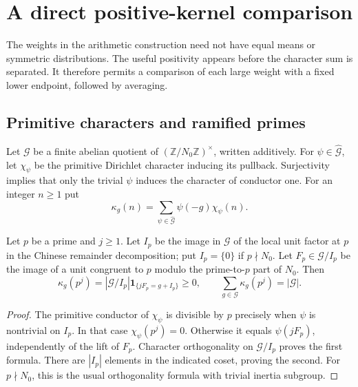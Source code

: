 \section{A direct positive-kernel comparison}
\label{rh-transfer}

The weights in the arithmetic construction need not have equal means
or symmetric distributions. The useful positivity appears before the
character sum is separated. It therefore permits a comparison of each
large weight with a fixed lower endpoint, followed by averaging.

\subsection{Primitive characters and ramified primes}

Let $\mathcal G$ be a finite abelian quotient of
$(\mathbb Z/N_0\mathbb Z)^\times$, written additively. For
$\psi\in\widehat{\mathcal G}$, let $\chi_\psi$ be the primitive
Dirichlet character inducing its pullback. Surjectivity implies that
only the trivial $\psi$ induces the character of conductor one.
For an integer $n\ge1$ put
\[
 \kappa_g(n)=\sum_{\psi\in\widehat{\mathcal G}}
                       \psi(-g)\chi_\psi(n).
\]

\begin{lemma}
\label{rh-kernel-positive}
Let $p$ be a prime and $j\ge1$. Let $I_p$ be the image in $\mathcal G$ of the local unit factor at $p$
in the Chinese remainder decomposition; put $I_p=\{0\}$ if
$p\nmid N_0$. Let $F_p\in\mathcal G/I_p$ be the image of a unit
congruent to $p$ modulo the prime-to-$p$ part of $N_0$. Then
\begin{equation}\label{rh-kappa}
 \kappa_g(p^j)=|\mathcal G/I_p|
                    \mathbf1_{\{jF_p=g+I_p\}}\ge0,
 \qquad \sum_{g\in\mathcal G}\kappa_g(p^j)=|\mathcal G|.
\end{equation}
\end{lemma}

\begin{proof}
The primitive conductor of $\chi_\psi$ is divisible by $p$ precisely
when $\psi$ is nontrivial on $I_p$. In that case
$\chi_\psi(p^j)=0$. Otherwise it equals $\psi(jF_p)$, independently
of the lift of $F_p$. Character orthogonality on $\mathcal G/I_p$
proves the first formula. There are $|I_p|$ elements in the indicated
coset, proving the second. For $p\nmid N_0$, this is the usual
orthogonality formula with trivial inertia subgroup.
\end{proof}

